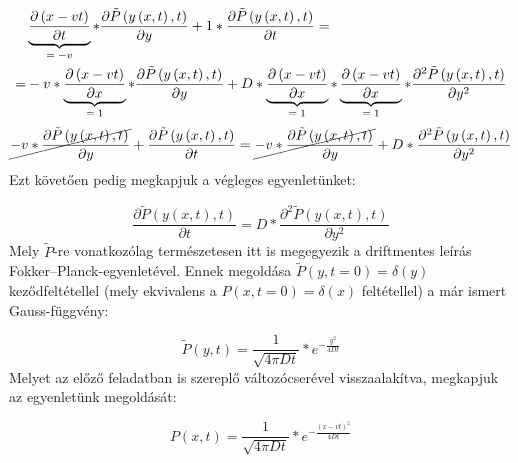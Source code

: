 \hrulefill
\begin{align}
    &\underbrace{\frac{\partial \left( x - vt \right)}{\partial t}}_{\text{\normalfont $= -v$}} * \frac{\partial \tilde{P} \left( y \left( x, t \right), t \right)}{\partial y}
    +
    1 * \frac{\partial \tilde{P} \left( y \left( x, t \right), t \right)}{\partial t}
    = \nonumber \\
    =&
    -
    v * \underbrace{\frac{\partial \left( x - vt \right)}{\partial x}}_{\text{\normalfont $= 1$}} * \frac{\partial \tilde{P} \left( y \left( x, t \right), t \right)}{\partial y}
    +
    D * \underbrace{\frac{\partial \left( x - vt \right)}{\partial x}}_{\text{\normalfont $= 1$}} * \underbrace{\frac{\partial \left( x - vt \right)}{\partial x}}_{\text{\normalfont $= 1$}} * \frac{\partial^{2} \tilde{P} \left( y \left( x, t \right), t \right)}{\partial y^{2}}
\end{align}
\hrulefill
\begin{equation}
    \cancel{-v * \frac{\partial \tilde{P} \left( y \left( x, t \right), t \right)}{\partial y}}
    +
    \frac{\partial \tilde{P} \left( y \left( x, t \right), t \right)}{\partial t}
    =
    \cancel{-
    v * \frac{\partial \tilde{P} \left( y \left( x, t \right), t \right)}{\partial y}}
    +
    D * \frac{\partial^{2} \tilde{P} \left( y \left( x, t \right), t \right)}{\partial y^{2}}
\end{equation}
Ezt követően pedig megkapjuk a végleges egyenletünket:

\begin{equation}
    \frac{\partial \tilde{P} \left( y \left( x, t \right), t \right)}{\partial t}
    =
    D * \frac{\partial^{2} \tilde{P} \left( y \left( x, t \right), t \right)}{\partial y^{2}}
\end{equation}
Mely $\tilde{P}$-re vonatkozólag természetesen itt is megegyezik a driftmentes leírás Fokker--Planck-egyenletével. Ennek megoldása $\tilde{P} \left( y, t = 0 \right) = \delta \left( y \right)$ keződfeltétellel (mely ekvivalens a $P \left( x, t = 0 \right) = \delta \left( x \right)$ feltétellel) a már ismert Gauss-függvény:

\begin{equation}
    \tilde{P} \left( y, t \right) = \frac{1}{\sqrt{4 \pi D t}} * e^{-\tfrac{y^{2}}{4Dt}}
\end{equation}
Melyet az előző feladatban is szereplő változócserével visszaalakítva, megkapjuk az egyenletünk megoldását:

\begin{equation}
    \boxed{P \left( x, t \right) = \frac{1}{\sqrt{4 \pi D t}} * e^{-\tfrac{\left(x - vt\right)^{2}}{4Dt}}}
\end{equation}